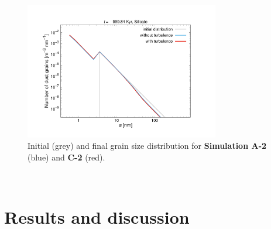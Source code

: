 \documentclass[fleqn,usenatbib]{mnras}
\begin{document}
  \begin{figure}
 \includegraphics[trim=2.4cm 1.5cm 2.2cm 2.3cm, clip=true,page=1,height = 6cm, page=1 ]{Pics/Pics_A2/Particlenumbers_04000_compare.pdf}
  \caption{Initial (grey) and final grain size distribution for \textbf{Simulation A-2} (blue) and \textbf{C-2} (red).}
  \label{fig_A2C2_osizedistribution}  
  \end{figure}  
\newpage~
\newpage~
\newpage~
\newpage
\section{Results and discussion}
\end{document}
